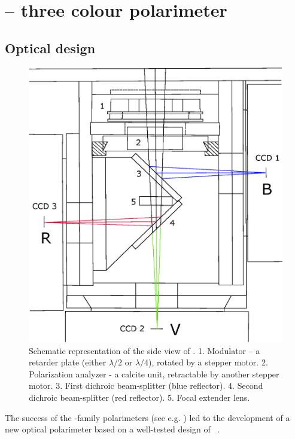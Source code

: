 \chapter{ -- three colour   polarimeter}
\section{Optical design}
\label{sec:dipol-uf}
\begin{figure}
    \centering
    \includegraphics[keepaspectratio, width = 1\linewidth]{images/dipol-uf.eps}
    \caption{ 
        Schematic representation of the side view of \DUF. 
        1. Modulator -- a retarder plate (either $\lambda/2$ or $\lambda/4$), rotated by a stepper motor.
        2. Polarization analyzer - a calcite unit, retractable by another stepper motor.
        3. First dichroic beam-splitter (blue reflector).
        4. Second dichroic beam-splitter (red reflector).
        5. Focal extender lens.}
    \label{fig:dipol-uf-optics}
\end{figure}
The success of the \DP-family polarimeters (see e.g. \citealt{Piirola2020}) led to the development of a new optical polarimeter based on a well-tested design of \DP\ \citep{Piirola2014}.
